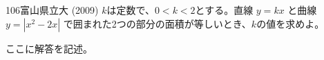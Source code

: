 \begin{thm}{106}{\maru}{富山県立大 (2009)}
 $k$は定数で、$0<k<2$とする。直線 $y=kx$ と曲線 $y=\left|x^2-2x\right|$ で囲まれた2つの部分の面積が等しいとき、$k$の値を求めよ。
\end{thm}

ここに解答を記述。